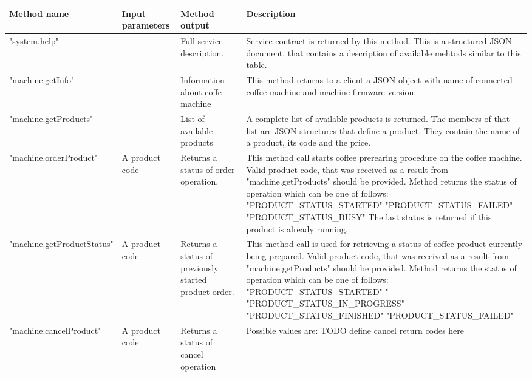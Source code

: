 \begin{longtable}[H]
	\centering	
	\begin{tabularx}{\textwidth}{|X|X|X|X|}
		\hline
		\textbf{Method name} & 
		\textbf{Input parameters}  	& 
		\textbf{Method output} &
		\textbf{Description} &
			
	    
	    \tabularnewline
		\hline
		"system.help" &
		-- &
		Full service description. &
		Service contract is returned by this method. 
		This is a structured JSON document, that contains a  description of available mehtods similar to this table. 
		
		\tabularnewline
		\hline
		"machine.getInfo" &
		-- &
		Information about coffe machine &
		This method returns to a client a JSON object with name of connected coffee machine and machine firmware version.

		\tabularnewline
		\hline
		"machine.getProducts" &
		-- &
		List of available products &
		A complete list of available products is returned.
		The members of that list are JSON structures that define a product.
		They contain the name of a product, its code and the price.
		
		\tabularnewline
		\hline
		"machine.orderProduct" &
		A product code &
		Returns a status of order operation. &
		This method call starts coffee prerearing procedure on the coffee machine.
		Valid product code, that was received as a result from  "machine.getProducts" should be provided.
		Method returns the status of operation which can be one of follows: \newline
		"PRODUCT\_STATUS\_STARTED" \newline
		"PRODUCT\_STATUS\_FAILED" \newline 
		"PRODUCT\_STATUS\_BUSY" 
		The last status is returned if this product is already running.
		
		
		\tabularnewline
		\hline
		"machine.getProductStatus" &
		A product code &
		Returns a status of previously started product order. &
		This method call is used for retrieving a status of coffee product currently being prepared.
		Valid product code, that was received as a result from  "machine.getProducts" should be provided.
		Method returns the status of operation which can be one of follows: \newline
		"PRODUCT\_STATUS\_STARTED" \newline"  
		"PRODUCT\_STATUS\_IN\_PROGRESS" \newline 
		"PRODUCT\_STATUS\_FINISHED" \newline 
		"PRODUCT\_STATUS\_FAILED" 
		
		\tabularnewline
		\hline
		"machine.cancelProduct" &
		A product code &
		Returns a status of cancel operation &
		Possible values are: \newline
		TODO define cancel return codes here
		
		
		\tabularnewline
		\hline
	\end{tabularx} 
	\caption{Embedded service remote methods}
	\label{tbl:service_remote_methods}
\end{longtable}

